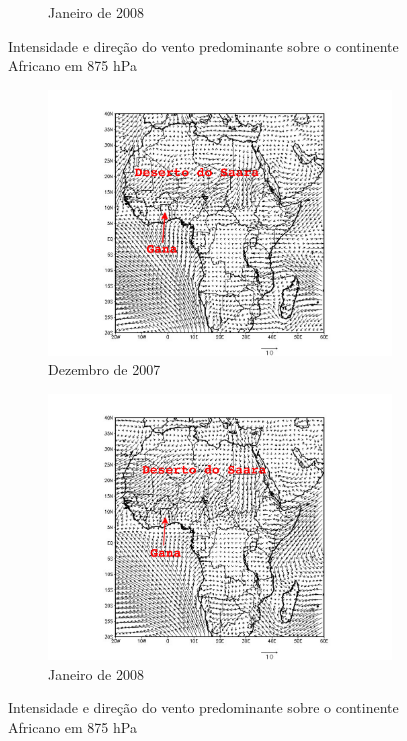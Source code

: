 \begin{figure}[H]
\begin{subfigure}[b]{0.5\linewidth}
    \caption{Janeiro de 2008}
  \end{subfigure}
  \caption{Intensidade e direção do vento predominante sobre o continente Africano
           em 875 hPa }
\end{figure}

\begin{figure}[H]
  \centering
  \begin{subfigure}[b]{0.5\linewidth}
    \includegraphics[width=\linewidth]{../inputs/grads/gimp/1000hPa/DEZ_2007.pdf}
    \caption{Dezembro de 2007}
  \end{subfigure}%
  \begin{subfigure}[b]{0.5\linewidth}
    \includegraphics[width=\linewidth]{../inputs/grads/gimp/1000hPa/JAN_2008.pdf}
    \caption{Janeiro de 2008}
  \end{subfigure}
  \caption{Intensidade e direção do vento predominante sobre o continente Africano
           em 875 hPa}
\end{figure}


